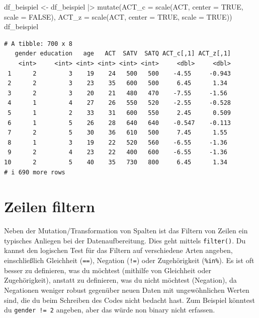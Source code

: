 \documentclass[
  letterpaper,
  DIV=11,
  numbers=noendperiod]{scrreprt}
\newenvironment{Shaded}{\begin{snugshade}}{\end{snugshade}}
\newcommand{\AttributeTok}[1]{\textcolor[rgb]{0.40,0.45,0.13}{#1}}
\newcommand{\ConstantTok}[1]{\textcolor[rgb]{0.56,0.35,0.01}{#1}}
\newcommand{\FunctionTok}[1]{\textcolor[rgb]{0.28,0.35,0.67}{#1}}
\newcommand{\NormalTok}[1]{\textcolor[rgb]{0.00,0.23,0.31}{#1}}
\newcommand{\OtherTok}[1]{\textcolor[rgb]{0.00,0.23,0.31}{#1}}
\newcommand{\SpecialCharTok}[1]{\textcolor[rgb]{0.37,0.37,0.37}{#1}}
\begin{document}
\begin{Shaded}
\begin{Highlighting}[]
\NormalTok{df\_beispiel }\OtherTok{\textless{}{-}}\NormalTok{ df\_beispiel }\SpecialCharTok{|\textgreater{}} \FunctionTok{mutate}\NormalTok{(}\AttributeTok{ACT\_c =} \FunctionTok{scale}\NormalTok{(ACT, }\AttributeTok{center =} \ConstantTok{TRUE}\NormalTok{, }\AttributeTok{scale =} \ConstantTok{FALSE}\NormalTok{),}
                                     \AttributeTok{ACT\_z =} \FunctionTok{scale}\NormalTok{(ACT, }\AttributeTok{center =} \ConstantTok{TRUE}\NormalTok{, }\AttributeTok{scale =} \ConstantTok{TRUE}\NormalTok{))}
\NormalTok{df\_beispiel}
\end{Highlighting}
\end{Shaded}

\begin{verbatim}
# A tibble: 700 x 8
   gender education   age   ACT  SATV  SATQ ACT_c[,1] ACT_z[,1]
    <int>     <int> <int> <int> <int> <int>     <dbl>     <dbl>
 1      2         3    19    24   500   500    -4.55     -0.943
 2      2         3    23    35   600   500     6.45      1.34 
 3      2         3    20    21   480   470    -7.55     -1.56 
 4      1         4    27    26   550   520    -2.55     -0.528
 5      1         2    33    31   600   550     2.45      0.509
 6      1         5    26    28   640   640    -0.547    -0.113
 7      2         5    30    36   610   500     7.45      1.55 
 8      1         3    19    22   520   560    -6.55     -1.36 
 9      2         4    23    22   400   600    -6.55     -1.36 
10      2         5    40    35   730   800     6.45      1.34 
# i 690 more rows
\end{verbatim}

\section{Zeilen filtern}\label{zeilen-filtern}

Neben der Mutation/Transformation von Spalten ist das Filtern von Zeilen
ein typisches Anliegen bei der Datenaufbereitung. Dies geht mittels
\texttt{filter()}. Du kannst den logischen Test für das Filtern auf
verschiedene Arten angeben, einschließlich Gleichheit (\texttt{==}),
Negation (\texttt{!=}) oder Zugehörigkeit (\texttt{\%in\%}). Es ist oft
besser zu definieren, was du möchtest (mithilfe von Gleichheit oder
Zugehörigkeit), anstatt zu definieren, was du nicht möchtest (Negation),
da Negationen weniger robust gegenüber neuen Daten mit ungewöhnlichen
Werten sind, die du beim Schreiben des Codes nicht bedacht hast. Zum
Beispiel könntest du \texttt{gender\ !=\ 2} angeben, aber das würde non
binary nicht erfassen.
\end{document}
